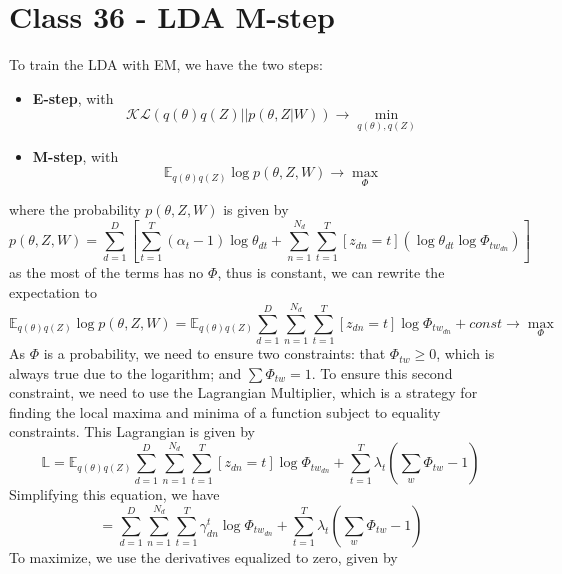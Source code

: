 \documentclass{article}
\begin{document}
\section{Class 36 - LDA M-step}
To train the LDA with EM, we have the two steps:
\begin{itemize}
    \item \textbf{E-step}, with \begin{equation}
        \mathcal{KL}(q(\theta)q(Z)||p(\theta, Z|W)) \rightarrow \min_{q(\theta),q(Z)}
    \end{equation}
    \item \textbf{M-step}, with \begin{equation}
        \mathbb{E}_{q(\theta)q(Z)} \log p(\theta, Z, W) \rightarrow \max_{\Phi}
    \end{equation}
\end{itemize}
where the probability $p(\theta, Z, W)$ is given by
\begin{equation}
    p(\theta, Z, W) = \sum_{d=1}^D \left[ 
    \sum_{t=1}^T(\alpha_t - 1)\log\theta_{dt} + \sum_{n=1}^{N_d} \sum_{t=1}^T [z_{dn} = t] (\log\theta_{dt}\log\Phi_{tw_{dn}})
    \right]
\end{equation}
as the most of the terms has no $\Phi$, thus is constant, we can rewrite the expectation to 
\begin{equation}
    \mathbb{E}_{q(\theta)q(Z)} \log p(\theta, Z, W) = \mathbb{E}_{q(\theta)q(Z)} \sum_{d=1}^D \sum_{n=1}^{N_d} \sum_{t=1}^T [z_{dn} = t] \log\Phi_{tw_{dn}} + const \rightarrow \max_\Phi
\end{equation}
As $\Phi$ is a probability, we need to ensure two constraints: that $\Phi_{tw} \geq 0$, which is always true due to the logarithm; and $\sum \Phi_{tw} = 1$. To ensure this second constraint, we need to use the Lagrangian Multiplier, which is a strategy for finding the local maxima and minima of a function subject to equality constraints. This Lagrangian is given by
\begin{equation}
    \mathbb{L} = \mathbb{E}_{q(\theta)q(Z)} \sum_{d=1}^D \sum_{n=1}^{N_d} \sum_{t=1}^T [z_{dn} = t] \log\Phi_{tw_{dn}} + 
    \sum_{t=1}^T \lambda_t(\sum_w\Phi_{tw} -1)
\end{equation}
Simplifying this equation, we have
\begin{equation}
    = \sum_{d=1}^D \sum_{n=1}^{N_d} \sum_{t=1}^T \gamma_{dn}^t \log\Phi_{tw_{dn}} + 
    \sum_{t=1}^T \lambda_t(\sum_w\Phi_{tw} -1)
\end{equation}
To maximize, we use the derivatives equalized to zero, given by
\end{document}
